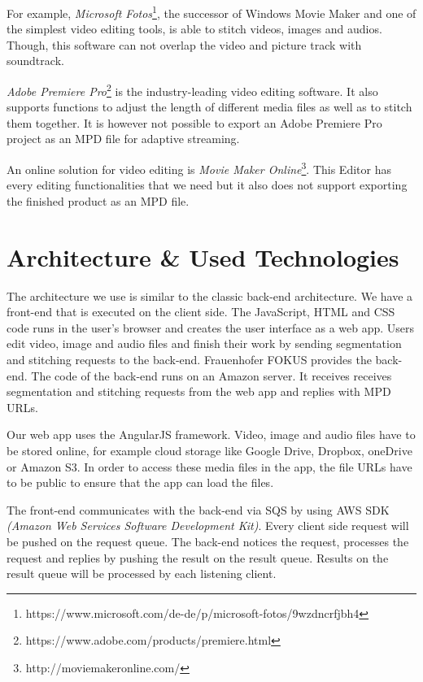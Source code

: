 \documentclass[conference]{IEEEtran}
\begin{document}
For example, \textit{Microsoft Fotos}\footnote{https://www.microsoft.com/de-de/p/microsoft-fotos/9wzdncrfjbh4}, the successor of Windows Movie Maker and one of the simplest video editing tools, is able to stitch videos, images and audios.
Though, this software can not overlap the video and picture track with soundtrack.

\textit{Adobe Premiere Pro}\footnote{https://www.adobe.com/products/premiere.html} is the industry-leading video editing software.
It also supports functions to adjust the length of different media files as well as to stitch them together.
It is however not possible to export an Adobe Premiere Pro project as an MPD file for adaptive streaming.

An online solution for video editing is \textit{Movie Maker Online}\footnote{http://moviemakeronline.com/}.
This Editor has every editing functionalities that we need but it also does not support exporting the finished product as an MPD file.

\section{Architecture \& Used Technologies}
The architecture we use is similar to the classic back-end architecture.
We have a front-end that is executed on the client side.
The JavaScript, HTML and CSS code runs in the user's browser and creates the user interface as a web app.
Users edit video, image and audio files and finish their work by sending segmentation and stitching requests to the back-end.
Frauenhofer FOKUS provides the back-end.
The code of the back-end runs on an Amazon server.
It receives receives segmentation and stitching requests from the web app and replies with MPD URLs.

Our web app uses the AngularJS framework.
Video, image and audio files have to be stored online, for example cloud storage like Google Drive, Dropbox, oneDrive or Amazon S3.
In order to access these media files in the app, the file URLs have to be public to ensure that the app can load the files.

The front-end communicates with the back-end via SQS by using AWS SDK \textit{(Amazon Web Services Software Development Kit)}.
Every client side request will be pushed on the request queue.
The back-end notices the request, processes the request and replies by pushing the result on the result queue.
Results on the result queue will be processed by each listening client.
\end{document}
